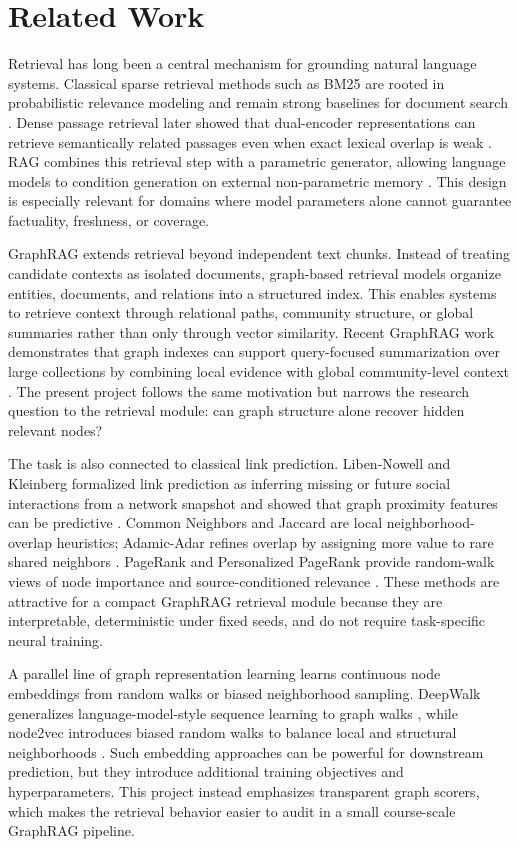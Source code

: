 \documentclass[10pt,twocolumn]{article}
\begin{document}
\section{Related Work}
Retrieval has long been a central mechanism for grounding natural language systems. Classical sparse retrieval methods such as BM25 are rooted in probabilistic relevance modeling and remain strong baselines for document search \citep{robertson2009bm25}. Dense passage retrieval later showed that dual-encoder representations can retrieve semantically related passages even when exact lexical overlap is weak \citep{karpukhin2020dpr}. RAG combines this retrieval step with a parametric generator, allowing language models to condition generation on external non-parametric memory \citep{lewis2020rag}. This design is especially relevant for domains where model parameters alone cannot guarantee factuality, freshness, or coverage.

GraphRAG extends retrieval beyond independent text chunks. Instead of treating candidate contexts as isolated documents, graph-based retrieval models organize entities, documents, and relations into a structured index. This enables systems to retrieve context through relational paths, community structure, or global summaries rather than only through vector similarity. Recent GraphRAG work demonstrates that graph indexes can support query-focused summarization over large collections by combining local evidence with global community-level context \citep{edge2024graphrag}. The present project follows the same motivation but narrows the research question to the retrieval module: can graph structure alone recover hidden relevant nodes?

The task is also connected to classical link prediction. Liben-Nowell and Kleinberg formalized link prediction as inferring missing or future social interactions from a network snapshot and showed that graph proximity features can be predictive \citep{liben2007link}. Common Neighbors and Jaccard are local neighborhood-overlap heuristics; Adamic-Adar refines overlap by assigning more value to rare shared neighbors \citep{adamic2003friends}. PageRank and Personalized PageRank provide random-walk views of node importance and source-conditioned relevance \citep{page1999pagerank,jeh2003scaling}. These methods are attractive for a compact GraphRAG retrieval module because they are interpretable, deterministic under fixed seeds, and do not require task-specific neural training.

A parallel line of graph representation learning learns continuous node embeddings from random walks or biased neighborhood sampling. DeepWalk generalizes language-model-style sequence learning to graph walks \citep{perozzi2014deepwalk}, while node2vec introduces biased random walks to balance local and structural neighborhoods \citep{grover2016node2vec}. Such embedding approaches can be powerful for downstream prediction, but they introduce additional training objectives and hyperparameters. This project instead emphasizes transparent graph scorers, which makes the retrieval behavior easier to audit in a small course-scale GraphRAG pipeline.
\end{document}
